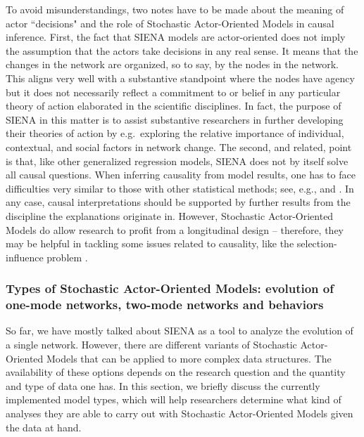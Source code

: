 \documentclass[a4paper,fleqn,11pt]{article}
\newcommand{\+}{\, + \,}
\newcommand{\SI}{{\sf SIENA }}
\newcommand{\saom}{{Stochastic Actor-Oriented Model}}
\begin{document}
To avoid misunderstandings, two notes have to be made about the
meaning of actor ``decisions" and the role of {\saom}s in causal inference.
First, the fact that \SI models are actor-oriented does not imply the assumption
that the actors take
decisions in any real sense. It means that the changes in the network are
organized, so to say, by the nodes in the network. This aligns very well
with a substantive standpoint where the nodes have agency \citep{Snijders96}
but it does not necessarily reflect a commitment to or belief in any particular
theory of action elaborated in
the scientific disciplines. In fact, the purpose of \SI in this matter is
to assist substantive researchers in further developing their theories
of action by e.g.\ exploring the relative importance of individual,
contextual, and social factors in network change. The second, and related,
point is that, like other generalized regression models, \SI does not
by itself solve all causal questions. When inferring causality from model
results, one has to face difficulties very similar to those with other
statistical methods; see, e.g., \citet{LSST11} and \citet{Goldthorpe2001}.
In any case, causal interpretations should be supported by further results
from the discipline the explanations originate in.
However, {\saom}s do allow research to profit from a longitudinal
design -- therefore, they may be helpful in tackling some issues related
to causality, like the selection-influence problem \citep{SteglichEA10, LSST11}.

\subsubsection[Types of {\saom}s]
     {Types of {\saom}s: \protect\newline
     evolution of one-mode networks, two-mode networks and behaviors}
\label{S_types}

So far, we have mostly talked about \SI as a tool to analyze the evolution
of a single network. However, there are different variants of {\saom}s that
can be applied to more complex data structures.
The availability of these options depends on the research question and the
quantity and type of data one has. In this section, we briefly discuss the
currently implemented model types, which will help researchers determine what
kind of analyses they are able to carry out with {\saom}s
given the data at hand.
\end{document}
